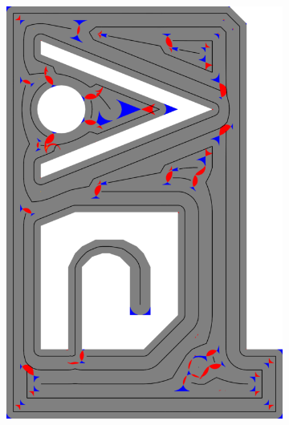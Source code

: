 \begin{figure}
\begin{subfigure}{\figwidth}
\includegraphics[height=\figheight]{sources/validation/gMAT_example/TEST_Center_accuracy.png}

\end{subfigure}
\end{figure}

